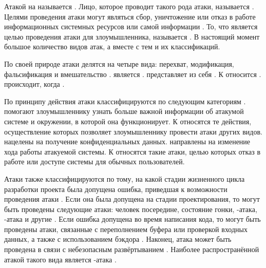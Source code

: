 \Sentence
Атакой на  называется  
.
\Sentence
Лицо, которое проводит такого рода атаки, называется  
. 
\Sentence
Целями проведения атаки могут являться сбор, уничтожение или отказ в работе информационных 
системных ресурсов или самой информации . 
\Sentence
То, что является целью проведения атаки для злоумышленника, называется 
. 
\Sentence
В настоящий момент большое количество видов атак, а вместе с тем и их классификаций.

\Sentence
По своей природе атаки делятся на четыре вида: перехват, модификация, фальсификация и вмешательство 
. 
\Sentence
{} является .
\Sentence
{} представляет из себя .
\Sentence
К  относится .
\Sentence
{} происходит, когда .

\Sentence
По принципу действия атаки классифицируются по следующим категориям .
\Sentence
{} помогают злоумышленнику узнать больше важной 
информации об атакумой системе и окружении, в которой она функционирует.
\Sentence
К  относятся те действия, осуществление которых позволяет 
злоумышленнику провести атаки других видов. 
\Sentence
{} нацелены на получение конфиденциальных данных. 
\Sentence
{} направлены на изменение хода работы атакуемой системы. 
\Sentence
К  относятся такие атаки, целью которых отказ в работе или 
доступе системы для обычных пользователей. 

\Sentence
Атаки также классифицируются по тому, на какой стадии жизненного цикла разработки проекта была 
допущена ошибка, приведшая к возможности проведения атаки .
\Sentence
Если она была допущена на стадии проектирования, то могут быть проведены следующие атаки: 
человек посередине, состояние гонки, -атака, -атака и 
другие .
\Sentence
Если ошибка допущена во время написания кода, то могут быть проведены атаки, связанные с 
переполнением буфера или проверкой входных данных, а также с использованием бэкдора 
.
\Sentence
Наконец, атака может быть проведена в связи с небезопасным развёртыванием . 
Наиболее распространённой атакой такого вида является -атака 
. 

